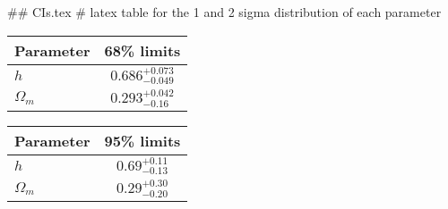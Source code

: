 ## CIs.tex
# latex table for the 1 and 2 sigma distribution of each parameter

\begin{tabular} { l  c}
 Parameter &  68\% limits\\
\hline
{\boldmath$h              $} & $0.686^{+0.073}_{-0.049}   $\\
{\boldmath$\Omega_m       $} & $0.293^{+0.042}_{-0.16}    $\\
\hline
\end{tabular}

\begin{tabular} { l  c}
 Parameter &  95\% limits\\
\hline
{\boldmath$h              $} & $0.69^{+0.11}_{-0.13}      $\\
{\boldmath$\Omega_m       $} & $0.29^{+0.30}_{-0.20}      $\\
\hline
\end{tabular}
